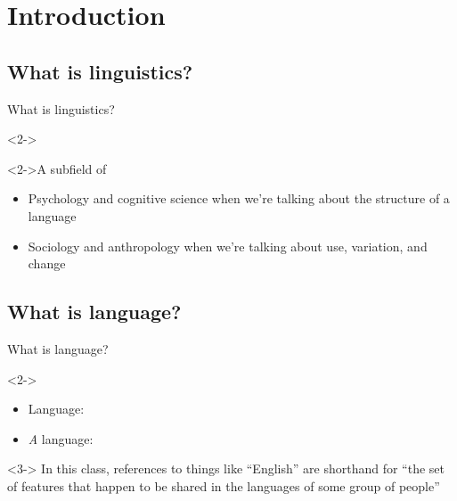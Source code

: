 \documentclass{beamer}
\newcommand{\subtwoone}{What is linguistics?}
\newcommand{\subtwotwo}{What is language?}
\begin{document}
  \section{Introduction}
    \subsection{\subtwoone}
      \begin{frame}{\subtwoone}
        \begin{definition}<2->
          
        \end{definition}
        \begin{block}<2->{A subfield of}
          \begin{itemize}
            \item Psychology and cognitive science when we're talking about the structure of a language
            \item Sociology and anthropology when we're talking about use, variation, and change
          \end{itemize}
        \end{block}
      \end{frame}

    \subsection{\subtwotwo}
      \begin{frame}{\subtwotwo}
        \begin{definition}<2->{}
          \begin{itemize}
            \item \alert{Language}: 
            \item \alert{\emph{A} language}: 
          \end{itemize}
        \end{definition}
        \begin{alertblock}<3->{}
          In this class, references to things like ``English'' are shorthand for ``the set of features that happen to be shared in the languages of some group of people''
        \end{alertblock}
      \end{frame}
\end{document}
